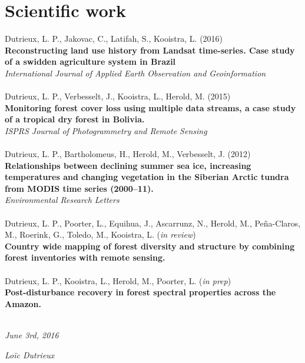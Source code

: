 \documentclass[]{friggeri-cv}
\begin{document}
\section{Scientific work}
    Dutrieux, L. P., Jakovac, C., Latifah, S., Kooistra, L. (2016)\\
    \textbf{Reconstructing land use history from Landsat time-series. Case study of a swidden agriculture system in Brazil}\\
    \textit{International Journal of Applied Earth Observation and Geoinformation}\\
    \\
    Dutrieux, L. P., Verbesselt, J., Kooistra, L., Herold, M. (2015)\\
    \textbf{Monitoring forest cover loss using multiple data streams, a case study of a tropical dry forest in Bolivia.}\\
    \textit{ISPRS Journal of Photogrammetry and Remote Sensing}\\
    \\
    Dutrieux, L. P., Bartholomeus, H., Herold, M., Verbesselt, J. (2012)\\
    \textbf{Relationships between declining summer sea ice, increasing temperatures and changing vegetation in the Siberian Arctic tundra from MODIS time series (2000–11).}\\
    \textit{Environmental Research Letters}\\
    \\
    Dutrieux, L. P., Poorter, L., Equihua, J., Ascarrunz, N., Herold, M., Pe\~{n}a-Claros, M., Roerink, G., Toledo, M., Kooistra, L. (\textit{in review})\\
    \textbf{Country wide mapping of forest diversity and structure by combining forest inventories with remote sensing.}\\
    \\
    Dutrieux, L. P., Kooistra, L., Herold, M., Poorter, L. (\textit{in prep})\\
    \textbf{Post-disturbance recovery in forest spectral properties across the Amazon.}\\
    \\


\begin{flushleft}
\emph{June 3rd, 2016}
\end{flushleft}
\begin{flushright}
\emph{Lo\"{i}c Dutrieux}
\end{flushright}
\end{document}
